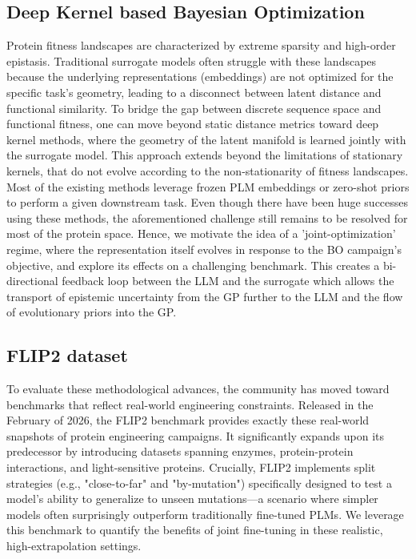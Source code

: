 \documentclass{article}
\theoremstyle{plain}
\theoremstyle{definition}
\theoremstyle{remark}
\begin{document}
\subsection{Deep Kernel based Bayesian Optimization}
Protein fitness landscapes are characterized by extreme sparsity and high-order epistasis. Traditional surrogate models often struggle with these landscapes because the underlying representations (embeddings) are not optimized for the specific task's geometry, leading to a disconnect between latent distance and functional similarity. To bridge the gap between discrete sequence space and functional fitness, one can move beyond static distance metrics toward deep kernel methods, where the geometry of the latent manifold is learned jointly with the surrogate model. This approach extends beyond the limitations of stationary kernels, that do not evolve according to the non-stationarity of fitness landscapes. Most of the existing methods leverage frozen PLM embeddings or zero-shot priors to perform a given downstream task. Even though there have been huge successes using these methods, the aforementioned challenge still remains to be resolved for most of the protein space. Hence, we motivate the idea of a 'joint-optimization' regime, where the representation itself evolves in response to the BO campaign's objective, and explore its effects on a challenging benchmark. This creates a bi-directional feedback loop between the LLM and the surrogate which allows the transport of epistemic uncertainty from the GP further to the LLM and the flow of evolutionary priors into the GP.

\subsection{FLIP2 dataset}
To evaluate these methodological advances, the community has moved toward benchmarks that reflect real-world engineering constraints. Released in the February of 2026, the FLIP2 benchmark \cite{didi2026flip2} provides exactly these real-world snapshots of protein engineering campaigns. It significantly expands upon its predecessor by introducing datasets spanning enzymes, protein-protein interactions, and light-sensitive proteins. Crucially, FLIP2 implements split strategies (e.g., "close-to-far" and "by-mutation") specifically designed to test a model's ability to generalize to unseen mutations—a scenario where simpler models often surprisingly outperform traditionally fine-tuned PLMs. We leverage this benchmark to quantify the benefits of joint fine-tuning in these realistic, high-extrapolation settings. 
\end{document}
